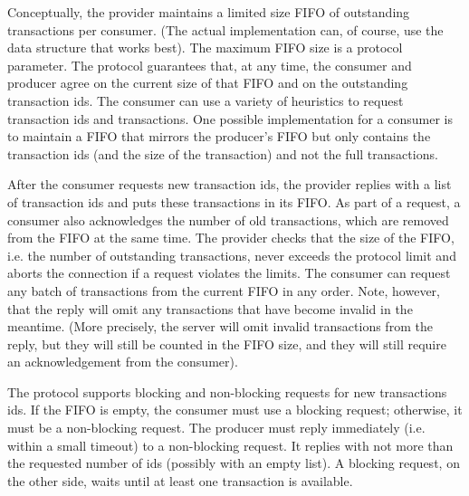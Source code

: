 Conceptually, the provider maintains a limited size FIFO of outstanding transactions per consumer.
(The actual implementation can, of course, use the data structure that works best).
The maximum FIFO size is a protocol parameter.
The protocol guarantees that, at any time, the consumer and producer agree on the current size of
that FIFO and on the outstanding transaction ids.
The consumer can use a variety of heuristics to request transaction ids and transactions.
One possible implementation for a consumer is to maintain a FIFO that mirrors the producer's FIFO
but only contains the transaction ids (and the size of the transaction) and not the full transactions.

After the consumer requests new transaction ids, the provider replies with a list of transaction ids and
puts these transactions in its FIFO.
As part of a request, a consumer also acknowledges the number of old transactions,
which are removed from the FIFO at the same time.
The provider checks that the size of the FIFO, i.e. the number of outstanding transactions,
never exceeds the protocol limit and aborts the connection if a request violates the limits.
The consumer can request any batch of transactions from the current FIFO in any order.
Note, however, that the reply will omit any transactions that have become invalid in the meantime.
(More precisely, the server will omit invalid transactions from the reply, but they will still be counted in the FIFO
size, and they will still require an acknowledgement from the consumer).

The protocol supports blocking and non-blocking requests for new transactions ids.
If the FIFO is empty, the consumer must use a blocking request; otherwise, it must be a non-blocking request.
The producer must reply immediately (i.e. within a small timeout) to a non-blocking request.
It replies with not more than the requested number of ids (possibly with an empty list).
A blocking request, on the other side, waits until at least one transaction is available.
